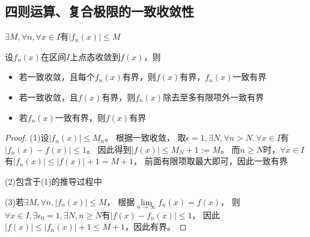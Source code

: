 \subsection{四则运算、复合极限的一致收敛性}

\begin{definition}[一致有界]
  $\exists M, \forall n, \forall x \in I$有$|f_n(x)| \leq M$
\end{definition}

\begin{lemma}[极限的有界性]
  设$f_n(x)$在区间$I$上点态收敛到$f(x)$，则
  \begin{itemize}
  \item 若一致收敛，且每个$f_n(x)$有界，则$f(x)$有界，$f_n(x)$一致有界
  \item 若一致收敛，且$f(x)$有界，则$f_n(x)$除去至多有限项外一致有界
  \item 若$f_n(x)$一致有界，则$f(x)$有界
  \end{itemize}
\end{lemma}

\begin{proof}
  (1)设$|f_n(x)| \leq M_n$。
  根据一致收敛，
  取$\epsilon = 1, \exists N, \forall n > N, \forall x \in I$有$|f_n(x) - f(x)| \leq 1$。
  因此得到$|f(x)| \leq M_N + 1 := M$。
  而$n \geq N$时，$\forall x \in I$有$|f_n(x)| \leq |f(x)| + 1 = M + 1$，
  前面有限项取最大即可，因此一致有界

  (2)包含于(1)的推导过程中

  (3)若$\exists M, \forall n, |f_n(x)| \leq M$，
  根据$\lim \limits _{n \rightarrow \infty} f_n(x) = f(x)$，
  则$\forall x \in I, \exists \epsilon_0 = 1, \exists N, n \geq N$有$|f(x) - f_n(x)| \leq 1$，
  因此$|f(x)| \leq |f_n(x)| + 1 \leq M+1$，因此有界。
\end{proof}




